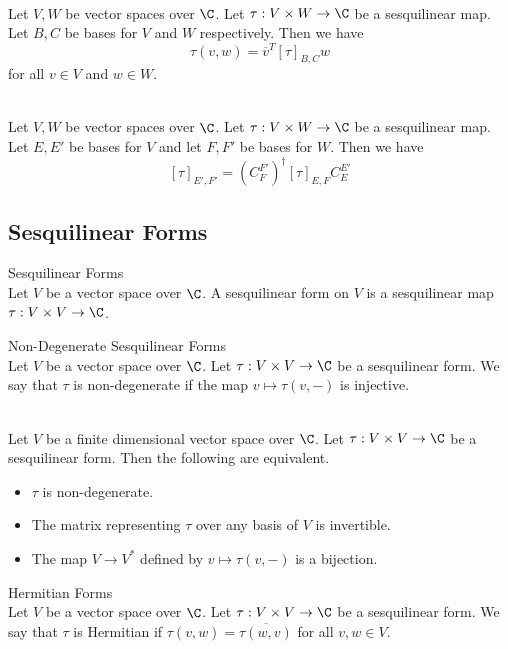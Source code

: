 \documentclass[a4paper]{article}
\begin{document}
\begin{prp}{}{}\\
Let $V,W$ be vector spaces over $\C$. Let $\tau:V\times W\to\C$ be a sesquilinear map. Let $B,C$ be bases for $V$ and $W$ respectively. Then we have $$\tau(v,w)=\overline{v}^T[\tau]_{B,C}w$$ for all $v\in V$ and $w\in W$. 
\end{prp}

\begin{prp}{}{}\\
Let $V,W$ be vector spaces over $\C$. Let $\tau:V\times W\to\C$ be a sesquilinear map. Let $E,E'$ be bases for $V$ and let $F,F'$ be bases for $W$. Then we have $$[\tau]_{E',F'}=(C_F^{F'})^\dagger[\tau]_{E,F}C_E^{E'}$$
\end{prp}

\subsection{Sesquilinear Forms}
\begin{defn}{Sesquilinear Forms}{}\\
Let $V$ be a vector space over $\C$. A sesquilinear form on $V$ is a sesquilinear map $\tau:V\times V\to\C$. 
\end{defn}

\begin{defn}{Non-Degenerate Sesquilinear Forms}{}\\
Let $V$ be a vector space over $\C$. Let $\tau:V\times V\to\C$ be a sesquilinear form. We say that $\tau$ is non-degenerate if the map $v\mapsto\tau(v,-)$ is injective. 
\end{defn}

\begin{prp}{}{}\\
Let $V$ be a finite dimensional vector space over $\C$. Let $\tau:V\times V\to\C$ be a sesquilinear form. Then the following are equivalent. 
\begin{itemize}
\item $\tau$ is non-degenerate. 
\item The matrix representing $\tau$ over any basis of $V$ is invertible. 
\item The map $V\to V^\ast$ defined by $v\mapsto\tau(v,-)$ is a bijection. 
\end{itemize}
\end{prp}

\begin{defn}{Hermitian Forms}{}\\
Let $V$ be a vector space over $\C$. Let $\tau:V\times V\to\C$ be a sesquilinear form. We say that $\tau$ is Hermitian if $\tau(v,w)=\overline{\tau(w,v)}$ for all $v,w\in V$. 
\end{defn}
\end{document}
